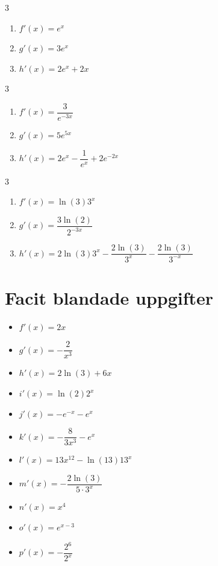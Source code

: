 \documentclass[a4paper, 12pt]{article}
\begin{document}
\begin{facit}
    \begin{multicols}{3}
        \begin{enumerate}
            \item $f'(x) = e^x$
            \item $g'(x) = 3e^x$
            \item $h'(x) = 2e^x + 2x$
        \end{enumerate}
    \end{multicols}
\end{facit}

\begin{facit}
    \begin{multicols}{3}
        \begin{enumerate}
            \item $f'(x) = \dfrac{3}{e^{-3x}}$
            \item $g'(x) = 5e^{5x}$
            \item $h'(x) = 2e^x - \dfrac 1{e^x} + 2e^{-2x}$
        \end{enumerate}
    \end{multicols}
\end{facit}

\begin{facit}
    \begin{multicols}{3}
        \begin{enumerate}
            \item $f'(x) = \ln (3) 3^x$
            \item $g'(x) = \dfrac{3\ln (2)}{2^{-3x}}$
            \item $h'(x) = 2 \ln (3) 3^x - \dfrac{2\ln (3)}{3^x} - \dfrac {2\ln (3)}{3^{-x}}$
        \end{enumerate}
    \end{multicols}
\end{facit}

\newpage
\section{Facit blandade uppgifter}

\begin{blufacit}
    \begin{itemize}
        \item $f'(x) = 2x$
        \item $g'(x) = -\dfrac{2}{x^3}$
        \item $h'(x) = 2 \ln(3) + 6x$
        \item $i'(x) = \ln(2) 2^x$
        \item $j'(x) = -e^{-x}- e^x$
        \item $k'(x) = -\dfrac{8}{3x^3}-e^x$
        \item $l'(x) = 13x^{12} - \ln(13)13^x$
        \item $m'(x) = -\dfrac{2\ln(3)}{5\cdot 3^x}$
        \item $n'(x) = x^4$
        \item $o'(x) = e^{x-3}$
        \item $p'(x) = - \dfrac{2^6}{2^x}$
    \end{itemize}
\end{blufacit}
\end{document}
